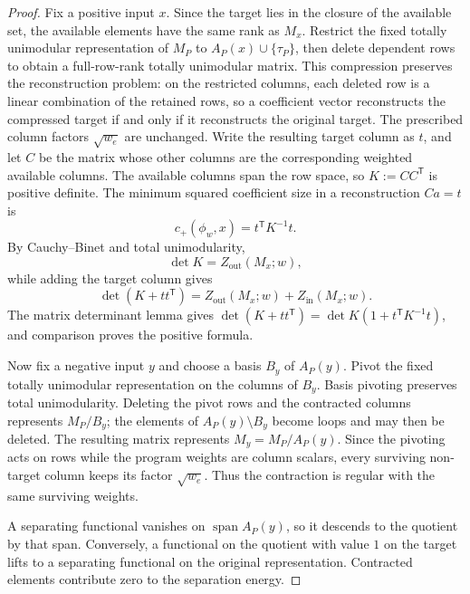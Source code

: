 \documentclass[11pt]{article}
\numberwithin{equation}{section}
\theoremstyle{remark}
\begin{document}
\begin{proof}
Fix a positive input $x$. Since the target lies in the closure of the
available set, the available elements have the same rank as $M_x$. Restrict
the fixed totally unimodular representation of $M_P$ to
$A_P(x)\cup\{\tau_P\}$, then delete dependent rows to obtain a full-row-rank
totally unimodular matrix. This compression preserves the reconstruction
problem: on the restricted columns, each deleted row is a linear combination
of the retained rows, so a coefficient vector reconstructs the compressed
target if and only if it reconstructs the original target. The prescribed
column factors $\sqrt{w_e}$ are unchanged. Write the resulting target column
as $t$, and let $C$ be the matrix whose other columns are the corresponding
weighted available columns. The available columns span the row space, so
$K:=CC^{\mathsf T}$ is positive definite. The minimum squared coefficient
size in a reconstruction $Ca=t$ is
\begin{equation}
    c_+(\phi_w,x)=t^{\mathsf T}K^{-1}t.
\end{equation}
By Cauchy--Binet and total unimodularity,
\begin{equation}
    \det K=Z_{\mathrm{out}}(M_x;w),
\end{equation}
while adding the target column gives
\begin{equation}
    \det(K+tt^{\mathsf T})
    =
    Z_{\mathrm{out}}(M_x;w)+Z_{\mathrm{in}}(M_x;w).
\end{equation}
The matrix determinant lemma gives
$\det(K+tt^{\mathsf T})=\det K(1+t^{\mathsf T}K^{-1}t)$, and comparison
proves the positive formula.

Now fix a negative input $y$ and choose a basis $B_y$ of $A_P(y)$.
Pivot the fixed totally unimodular representation on the columns of $B_y$.
Basis pivoting preserves total unimodularity. Deleting the pivot rows and the
contracted columns represents $M_P/B_y$; the elements of
$A_P(y)\setminus B_y$ become loops and may then be deleted. The resulting
matrix represents $M_y=M_P/A_P(y)$. Since the pivoting acts on rows while the
program weights are column scalars, every surviving non-target column keeps
its factor $\sqrt{w_e}$. Thus the contraction is regular with the same
surviving weights.

A separating functional vanishes on $\operatorname{span}A_P(y)$, so it
descends to the quotient by that span. Conversely, a functional on the
quotient with value $1$ on the target lifts to a separating functional on the
original representation. Contracted elements contribute zero to the
separation energy.


\end{proof}
\end{document}
